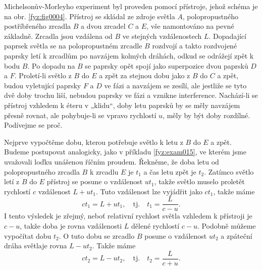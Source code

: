     Michelsonův-Morleyho experiment byl proveden pomocí přístroje, jehož schéma je na obr. 
    \ref{fyz:fig0004}. Přístroj se skládal ze zdroje světla \(A\), polopropustného postříbřeného 
    zrcadla \(B\) a dvou zrcadel \(C\) a \(E\), vše namontováno na pevné základně. Zrcadla jsou 
    vzdálena od \(B\) ve stejných vzdálenostech \(L\). Dopadající paprsek světla se na 
    polopropustném zrcadle \(B\) rozdvojí a takto rozdvojené paprsky letí k zrcadlům po navzájem 
    kolmých dráhách, odkud se odrážejí zpět k bodu \(B\). Po dopadu na \(B\) se paprsky opět spojí 
    jako superpozice dvou paprsků \(D\) a \(F\). Proletí-li světlo z \(B\) do \(E\) a zpět za 
    stejnou dobu jako z \(B\) do \(C\) a zpět, budou vyletující paprsky \(F\) a \(D\) ve fázi a 
    navzájem se zesílí, ale jestliže se tyto dvě doby trochu liší, nebudou paprsky ve fázi a 
    vznikne interference. Nachází-li se přístroj vzhledem k éteru v „klidu“, doby letu paprsků by 
    se měly navzájem přesně rovnat, ale pohybuje-li se vpravo rychlostí \(u\), měly by být doby 
    rozdílné. Podívejme se proč.
    
    Nejprve vypočtěme dobu, kterou potřebuje světlo k letu z \(B\) do \(E\) a zpět. Budeme
    postupovat analogicky, jako v příkladu \ref{fyz:exam015}, ve kterém jsme uvažovali loďku
    unášenou říčním proudem. Řekněme, že doba letu od polopropustného zrcadla \(B\) k zrcadlu \(E\)
    je \(t_1\) a čas letu zpět je \(t_2\). Zatímco světlo letí z \(B\) do \(E\) přístroj se posune o
    vzdálenost \(ut_1\), takže světlo muselo proletět rychlostí \(c\) vzdálenost \(L + ut_1\). Tuto
    vzdálenost lze vyjádřit jako \(ct_1\), takže máme    
    \begin{equation*}
      ct_1 = L + ut_1, \quad\text{tj.}\quad t_1 = \frac{L}{c - u}.
    \end{equation*}
    I tento výsledek je zřejmý, neboť relativní rychlost světla vzhledem k přístroji je \(c - u\), 
    takže doba je rovna vzdálenosti \(L\) dělené rychlostí \(c- u\). Podobně můžeme vypočítat dobu 
    \(t_2\). O tuto dobu se zrcadlo \(B\) posune o vzdálenost \(ut_2\) a zpáteční dráha světlaje 
    rovna \(L- ut_2\). Takže máme
    \begin{equation*}
      ct_2 = L - ut_2, \quad\text{tj.}\quad t_2 = \frac{L}{c + u}.
    \end{equation*}
    
    
